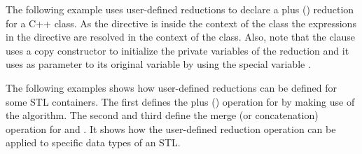

The following example uses user-defined reductions to declare a plus (\kcode{+}) 
reduction for a C++ class. As the  directive 
is inside the context of the  class the expressions in the 
 directive are resolved in the context of 
the class. Also, note that the  clause uses a copy 
constructor to initialize the private variables of the reduction and it uses 
as parameter to its original variable by using the special variable 
.


The following examples shows how user-defined reductions can be defined for 
some STL containers. The first  defines the 
plus (\kcode{+}) operation for  by making use of the 
 algorithm. The second and third define the merge (or 
concatenation) operation for  and . 
It shows how the user-defined reduction operation can be applied to specific 
data types of an STL.



